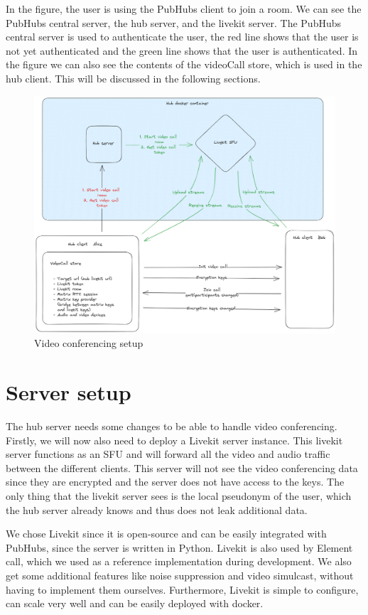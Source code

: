\documentclass{report}
\begin{document}
In the figure, the user is using the PubHubs client to join a room. We can see the PubHubs central server, the hub
server, and the livekit server. The PubHubs central server is used to authenticate the user, the red line shows that
the user is not yet authenticated and the green line shows that the user is authenticated. In the figure we can also see
the contents of the videoCall store, which is used in the hub client. This will be discussed in the following sections.

\begin{figure}[!hbt]
\centering
\includegraphics[width=1\textwidth]{img/PH_videocall.excalidraw.png}
\caption{Video conferencing setup}
\label{fig:video-conference-setup}
\end{figure}


\section{Server setup}
The hub server needs some changes to be able to handle video conferencing. Firstly, we will now also need to deploy a
Livekit server instance. This livekit server functions as an SFU and will forward all the video and audio traffic
between the different clients. This server will not see the video conferencing data since they are
encrypted and the server does not have access to the keys. The only thing that the livekit server sees is the local
pseudonym of the user, which the hub server already knows and thus does not leak additional data.

We chose Livekit since it is open-source and can be easily integrated with PubHubs, since the server is written in
Python. Livekit is also used by Element call, which we used as a reference implementation during development. We
also get some additional features like noise suppression and video simulcast, without having to implement them
ourselves. Furthermore, Livekit is simple to configure, can scale very well and can be easily deployed with docker.
\end{document}
